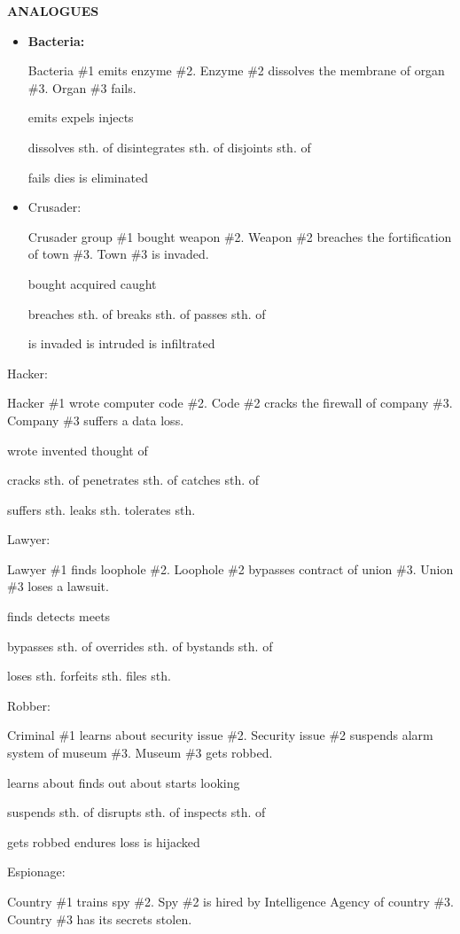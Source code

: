\textbf{ANALOGUES}\newline
\begin{itemize}
\item
  \textbf{Bacteria:}

  Bacteria \#1 emits enzyme \#2.
  Enzyme \#2 dissolves the membrane of organ \#3.
  Organ \#3 fails.

  emits
  expels
  injects

  dissolves sth. of
  disintegrates sth. of
  disjoints sth. of

  fails
  dies
  is eliminated

\item
  Crusader:

  Crusader group \#1 bought weapon \#2.
  Weapon \#2 breaches the fortification of town \#3.
  Town \#3 is invaded.

  bought
  acquired
  caught

  breaches sth. of
  breaks sth. of
  passes sth. of

  is invaded
  is intruded
  is infiltrated

\end{itemize}
Hacker:

Hacker \#1 wrote computer code \#2.
Code \#2 cracks the firewall of company \#3.
Company \#3 suffers a data loss.


wrote
invented
thought of

cracks sth. of
penetrates sth. of
catches sth. of

suffers sth.
leaks sth.
tolerates sth.


Lawyer:

Lawyer \#1 finds loophole \#2.
Loophole \#2 bypasses contract of union \#3.
Union \#3 loses a lawsuit.

finds
detects
meets

bypasses sth. of
overrides sth. of
bystands sth. of

loses sth.
forfeits sth.
files sth.


Robber:

Criminal \#1 learns about security issue \#2.
Security issue \#2 suspends alarm system of museum \#3.
Museum \#3 gets robbed.

learns about
finds out about
starts looking

suspends sth. of
disrupts sth. of
inspects sth. of

gets robbed
endures loss
is hijacked


Espionage:

Country \#1 trains spy \#2.
Spy \#2 is hired by Intelligence Agency of country \#3.
Country \#3 has its secrets stolen.

